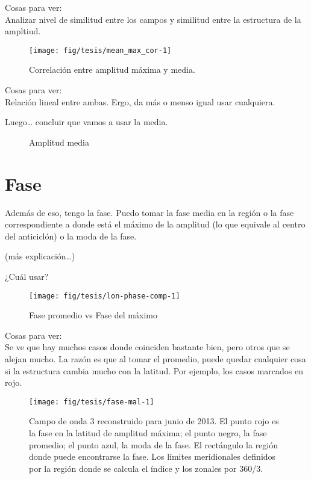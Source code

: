 \documentclass[spanish,a4paper]{book}
\begin{document}
Cosas para ver:\\
Analizar nivel de similitud entre los campos y similitud entre la
estructura de la ampltiud.

\begin{figure}
\texttt{[image: fig/tesis/mean\_max\_cor-1]} \caption{Correlación entre amplitud máxima y media.}\label{fig:mean_max_cor}
\end{figure}

Cosas para ver:\\
Relación lineal entre ambas. Ergo, da más o menso igual usar cualquiera.

Luego\ldots{} concluir que vamos a usar la media.

\begin{figure*}
\newline{}\caption{Amplitud media}\label{fig:amplitud_timeseries}
\end{figure*}

\section{Fase}\label{fase}

Además de eso, tengo la fase. Puedo tomar la fase media en la región o
la fase correspondiente a donde está el máximo de la amplitud (lo que
equivale al centro del anticiclón) o la moda de la fase.

(más explicación\ldots{})

¿Cuál usar?

\begin{figure}

{\centering \texttt{[image: fig/tesis/lon-phase-comp-1]} 

}

\caption{Fase promedio vs Fase del máximo}\label{fig:lon-phase-comp}
\end{figure}

Cosas para ver:\\
Se ve que hay muchos casos donde coinciden bastante bien, pero otros que
se alejan mucho. La razón es que al tomar el promedio, puede quedar
cualquier cosa si la estructura cambia mucho con la latitud. Por
ejemplo, los casos marcados en rojo.

\begin{figure}
\texttt{[image: fig/tesis/fase-mal-1]} \caption{Campo de onda 3 reconstruido para junio de 2013. El punto rojo es la fase en la latitud de amplitud máxima; el punto negro, la fase promedio; el punto azul, la moda de la fase. El rectángulo la región donde puede encontrarse la fase. Los límites meridionales definidos por la región donde se calcula el índice y los zonales por 360/3.}\label{fig:fase-mal}
\end{figure}
\end{document}
